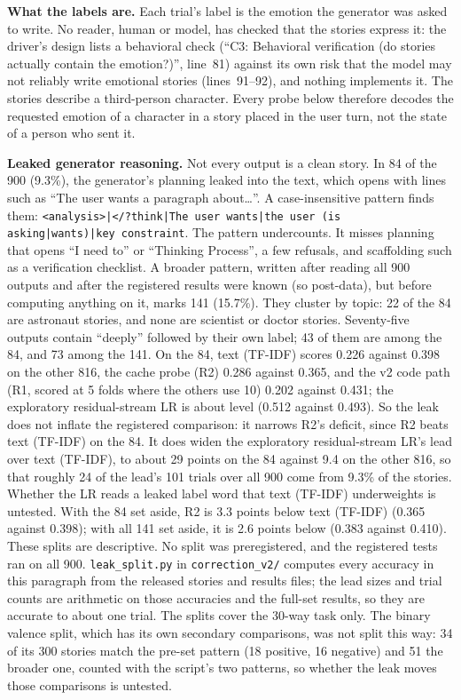 \documentclass[11pt,a4paper]{article}
\begin{document}
\textbf{What the labels are.} Each trial's label is the emotion the generator was asked to write. No reader, human or model, has checked that the stories express it: the driver's design lists a behavioral check (``C3: Behavioral verification (do stories actually contain the emotion?)'', line~81) against its own risk that the model may not reliably write emotional stories (lines~91--92), and nothing implements it. The stories describe a third-person character. Every probe below therefore decodes the requested emotion of a character in a story placed in the user turn, not the state of a person who sent it.

\textbf{Leaked generator reasoning.}\label{sec:leak} Not every output is a clean story. In 84 of the 900 (9.3\%), the generator's planning leaked into the text, which opens with lines such as ``The user wants a paragraph about\ldots''. A case-insensitive pattern finds them: \texttt{<analysis>|</?think|The user wants|the user (is asking|wants)|key constraint}. The pattern undercounts. It misses planning that opens ``I need to'' or ``Thinking Process'', a few refusals, and scaffolding such as a verification checklist. A broader pattern, written after reading all 900 outputs and after the registered results were known (so post-data), but before computing anything on it, marks 141 (15.7\%). They cluster by topic: 22 of the 84 are astronaut stories, and none are scientist or doctor stories. Seventy-five outputs contain ``deeply'' followed by their own label; 43 of them are among the 84, and 73 among the 141. On the 84, text (TF-IDF) scores 0.226 against 0.398 on the other 816, the cache probe (R2) 0.286 against 0.365, and the v2 code path (R1, scored at 5 folds where the others use 10) 0.202 against 0.431; the exploratory residual-stream LR is about level (0.512 against 0.493). So the leak does not inflate the registered comparison: it narrows R2's deficit, since R2 beats text (TF-IDF) on the 84. It does widen the exploratory residual-stream LR's lead over text (TF-IDF), to about 29 points on the 84 against 9.4 on the other 816, so that roughly 24 of the lead's 101 trials over all 900 come from 9.3\% of the stories. Whether the LR reads a leaked label word that text (TF-IDF) underweights is untested. With the 84 set aside, R2 is 3.3 points below text (TF-IDF) (0.365 against 0.398); with all 141 set aside, it is 2.6 points below (0.383 against 0.410). These splits are descriptive. No split was preregistered, and the registered tests ran on all 900. \texttt{leak\_split.py} in \texttt{correction\_v2/} computes every accuracy in this paragraph from the released stories and results files; the lead sizes and trial counts are arithmetic on those accuracies and the full-set results, so they are accurate to about one trial. The splits cover the 30-way task only. The binary valence split, which has its own secondary comparisons, was not split this way: 34 of its 300 stories match the pre-set pattern (18 positive, 16 negative) and 51 the broader one, counted with the script's two patterns, so whether the leak moves those comparisons is untested.
\end{document}
